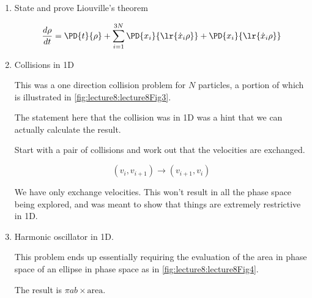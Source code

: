 \begin{enumerate}
\item State and prove Liouville's theorem

\begin{dmath}\label{eqn:basicStatMechLecture8:140}
\frac{d\rho}{dt} = 
\PD{t}{\rho} + 
\sum_{i = 1}^{3N} 
\PD{x_i}{
\lr{\dot{x}_i \rho}
}
+
\PD{x_i}{
\lr{\dot{x}_i \rho}
}
\end{dmath}

\item Collisions in 1D

This was a one direction collision problem for $N$ particles, a portion of which is illustrated in \cref{fig:lecture8:lecture8Fig3}.


The statement here that the collision was in 1D was a hint that we can actually calculate the result.

Start with a pair of collisions and work out that the velocities are exchanged.

\begin{equation}\label{eqn:basicStatMechLecture8:160}
(v_i, v_{i+1}) \rightarrow (v_{i+1}, v_{i})
\end{equation}

We have only exchange velocities.  This won't result in all the phase space being explored, and was meant to show that things are extremely restrictive in 1D.

\item Harmonic oscillator in 1D.

This problem ends up essentially requiring the evaluation of the area in phase space of an ellipse in phase space as in \cref{fig:lecture8:lecture8Fig4}.


The result is $\pi a b \times \text{area}$.

\end{enumerate}
